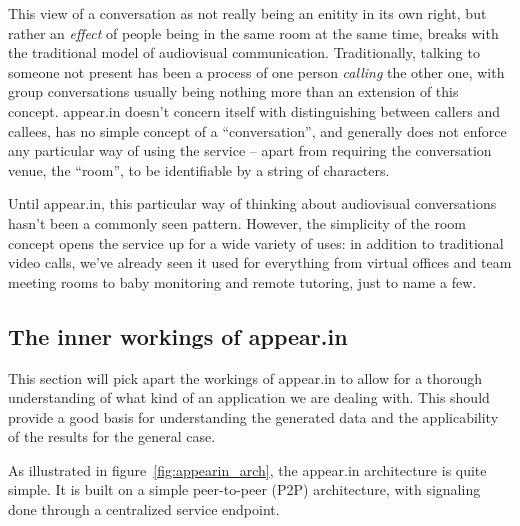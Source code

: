     This view of a conversation as not really being an enitity in its own right, but rather an \emph{effect} of people being in the same room at the same time, breaks with the traditional model of audiovisual communication. Traditionally, talking to someone not present has been a process of one person \emph{calling} the other one, with group conversations usually being nothing more than an extension of this concept. appear.in doesn't concern itself with distinguishing between callers and callees, has no simple concept of a ``conversation'', and generally does not enforce any particular way of using the service -- apart from requiring the conversation venue, the ``room'', to be identifiable by a string of characters.

    Until appear.in, this particular way of thinking about audiovisual conversations hasn't been a commonly seen pattern. However, the simplicity of the room concept opens the service up for a wide variety of uses: in addition to traditional video calls, we've already seen it used for everything from virtual offices and team meeting rooms to baby monitoring and remote tutoring, just to name a few.

  \subsection{The inner workings of appear.in}
  \label{survey:appearin_details}

  This section will pick apart the workings of appear.in to allow for a thorough understanding of what kind of an application we are dealing with. This should provide a good basis for understanding the generated data and the applicability of the results for the general case.

    As illustrated in figure~\ref{fig:appearin_arch}, the appear.in architecture is quite simple. It is built on a simple peer-to-peer (P2P) architecture, with signaling done through a centralized service endpoint.

